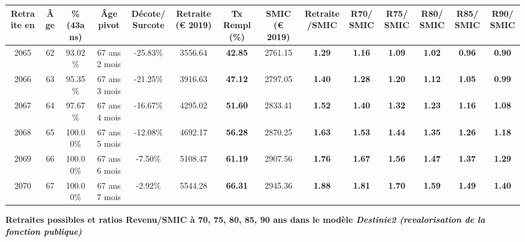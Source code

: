 \begin{adjustbox}{max width=\textwidth} 
\begin{tabular}[htb]{|c|c||c|c|c||c|c||c|c||c|c|c|c|c|} 
\hline 
 Retraite en &  Âge &  \%(43ans) &  Âge pivot &  Décote/Surcote &  Retraite (\euro{} 2019) &  Tx Rempl(\%) &  SMIC (\euro{} 2019) &  Retraite/SMIC &  R70/SMIC &  R75/SMIC &  R80/SMIC &  R85/SMIC &  R90/SMIC \\ 
\hline \hline 
 2065 &  62 &  93.02\% &  67 ans 2 mois &  -25.83\% &  3556.64 &  {\bf 42.85} &  2761.15 &  {\bf 1.29} &  {\bf 1.16} &  {\bf 1.09} &  {\bf 1.02} &  {\bf {\color{red} 0.96}} &  {\bf {\color{red} 0.90}} \\ 
\hline 
 2066 &  63 &  95.35\% &  67 ans 3 mois &  -21.25\% &  3916.63 &  {\bf 47.12} &  2797.05 &  {\bf 1.40} &  {\bf 1.28} &  {\bf 1.20} &  {\bf 1.12} &  {\bf 1.05} &  {\bf {\color{red} 0.99}} \\ 
\hline 
 2067 &  64 &  97.67\% &  67 ans 4 mois &  -16.67\% &  4295.02 &  {\bf 51.60} &  2833.41 &  {\bf 1.52} &  {\bf 1.40} &  {\bf 1.32} &  {\bf 1.23} &  {\bf 1.16} &  {\bf 1.08} \\ 
\hline 
 2068 &  65 &  100.00\% &  67 ans 5 mois &  -12.08\% &  4692.17 &  {\bf 56.28} &  2870.25 &  {\bf 1.63} &  {\bf 1.53} &  {\bf 1.44} &  {\bf 1.35} &  {\bf 1.26} &  {\bf 1.18} \\ 
\hline 
 2069 &  66 &  100.00\% &  67 ans 6 mois &  -7.50\% &  5108.47 &  {\bf 61.19} &  2907.56 &  {\bf 1.76} &  {\bf 1.67} &  {\bf 1.56} &  {\bf 1.47} &  {\bf 1.37} &  {\bf 1.29} \\ 
\hline 
 2070 &  67 &  100.00\% &  67 ans 7 mois &  -2.92\% &  5544.28 &  {\bf 66.31} &  2945.36 &  {\bf 1.88} &  {\bf 1.81} &  {\bf 1.70} &  {\bf 1.59} &  {\bf 1.49} &  {\bf 1.40} \\ 
\hline 
\hline 
\end{tabular} 
\end{adjustbox} 
 
 \vspace{0.1cm} 
{\bf \noindent Retraites possibles et ratios Revenu/SMIC à 70, 75, 80, 85, 90 ans dans le modèle \emph{Destinie2 (revalorisation de la fonction publique)}}  
 
